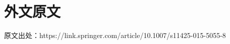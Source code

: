 \cleardoublepage
\chapter{外文原文}
原文出处：https://link.springer.com/article/10.1007/s11425-015-5055-8
\begin{center}
    
\end{center}

%     
